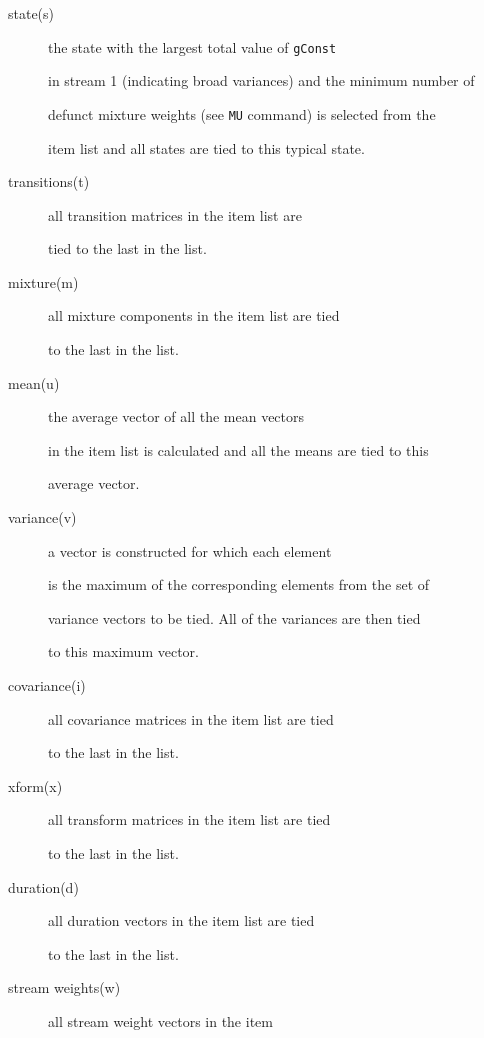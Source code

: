 \begin{description}


   \item[state(s)] the state with the largest total value of \texttt{gConst}


     in stream 1 (indicating broad variances) and the minimum number of


     defunct mixture weights (see \texttt{MU} command) is selected from the


   item list and all states are tied to this typical state.


   \item[transitions(t)] all transition matrices in the item list are


     tied to the last in the list.


   \item[mixture(m)] all mixture components in the item list are tied


   to the last in the list.


   \item[mean(u)] the average vector of all the mean vectors


   in the item list is calculated and all the means are tied to this


   average vector.


   \item[variance(v)] a vector is constructed for which each element


   is the maximum of the corresponding elements from the set of 


   variance vectors to be tied.  All of the variances are then tied


   to this maximum vector.


   \item[covariance(i)] all covariance matrices in the item list are tied


   to the last in the list.


   \item[xform(x)] all transform matrices in the item list are tied


   to the last in the list.


   \item[duration(d)] all duration vectors in the item list are tied


   to the last in the list.


   \item[stream weights(w)] all stream weight vectors in the item 



\end{description}
